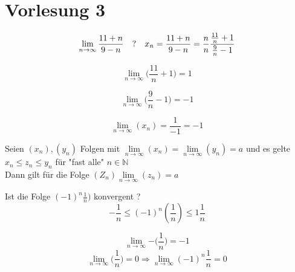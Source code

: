 \section{Vorlesung 3}

\begin{example}

\end{example}
\begin{equation}
    \lim\limits_{n \rightarrow \infty}{\frac{11+n}{9-n}}\quad ? \\
    \\\quad x_n = \frac{11+n}{9-n}=\frac{n}{n} \frac{\frac{11}{n}+1}{\frac{9}{n}-1}
\end{equation}

\begin{equation}
    \lim\limits_{n \rightarrow \infty}{\bigg(\frac{11}{n}+1\bigg)}=1
\end{equation}

\begin{equation}
    \lim\limits_{n \rightarrow \infty}{\bigg(\frac{9}{n}-1\bigg)}=-1
\end{equation}

\begin{equation}
    \lim\limits_{n \rightarrow \infty}{(x_n)}= \frac{1}{-1}=-1
\end{equation}

\begin{lemma}[Quetschlemma]
    Seien $(x_n),(y_n)$ Folgen mit $\lim\limits_{n \rightarrow \infty}{(x_n)}= \lim\limits_{n \rightarrow \infty}{(y_n)}= a$ und es gelte
    $x_n \leq z_n \leq y_n$ für "fast alle"  $n \in \mathbb{N}$\\

    Dann gilt für die Folge $(Z_n) \lim\limits_{n \rightarrow \infty}{(z_n)}=a$
\end{lemma}

\begin{example}
    Ist die Folge $(-1)^n\frac{1}{n})$ konvergent ?\\

    \[ - \frac{1}{n} \leq(-1)^n(\frac{1}{n}) \leq 1 \frac{1}{n}\]

    \[ \lim\limits_{n \rightarrow \infty}{- \big(\frac{1}{n} \big)}= -1 \]
    \[ \lim\limits_{n \rightarrow \infty}{ \big(\frac{1}{n} \big)}= 0 \Rightarrow \lim\limits_{n \rightarrow \infty}{(-1)^n \frac{1}{n}}= 0
    \]
\end{example}

\newpage

